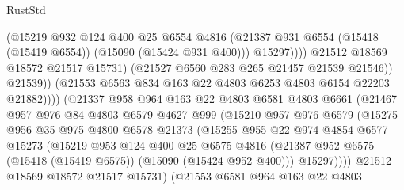\begin{lexlean}{RustStd}
\begin{coremodule}
                                    (@15219
                                      @932
                                      @124
                                      @400
                                      @25
                                      @6554
                                      @4816
                                      (@21387
                                        @931
                                        @6554
                                        (@15418 (@15419 @6554))
                                        (@15090 (@15424 @931 @400)))
                                      @15297))))
                              @21512
                              @18569
                              @18572
                              @21517
                              @15731)
                            (@21527 @6560 @283 @265 @21457 @21539 @21546))
                          @21539))
                      (@21553 @6563 @834 @163 @22 @4803 @6253 @4803 @6154 @22203 @21882))))
                (@21337
                  @958
                  @964
                  @163
                  @22
                  @4803
                  @6581
                  @4803
                  @6661
                  (@21467
                    @957
                    @976
                    @84
                    @4803
                    @6579
                    @4627
                    @999
                    (@15210
                      @957
                      @976
                      @6579
                      (@15275
                        @956
                        @35
                        @975
                        @4800
                        @6578
                        @21373
                        (@15255
                          @955
                          @22
                          @974
                          @4854
                          @6577
                          @15273
                          (@15219
                            @953
                            @124
                            @400
                            @25
                            @6575
                            @4816
                            (@21387 @952 @6575 (@15418 (@15419 @6575)) (@15090 (@15424 @952 @400)))
                            @15297))))
                    @21512
                    @18569
                    @18572
                    @21517
                    @15731)
                  (@21553
                    @6581
                    @964
                    @163
                    @22
                    @4803

\end{coremodule}
\end{lexlean}
